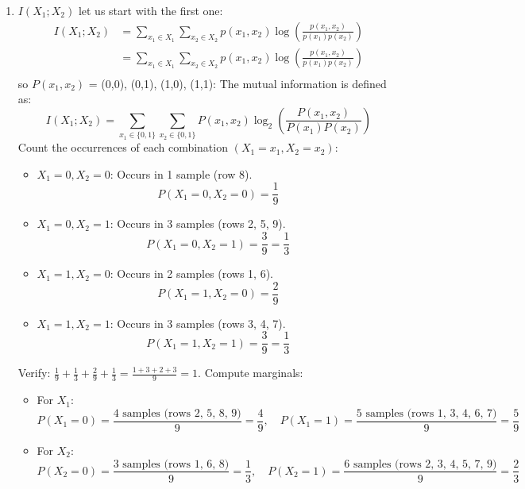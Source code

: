 \documentclass[a3paper,12pt]{extarticle} %
\begin{document}
\begin{enumerate}
    \item \( I(X_1; X_2) \)
let us start with the first one:
\begin{align*}
I(X_1; X_2) &= \sum_{x_1 \in X_1} \sum_{x_2 \in X_2} p(x_1,x_2) \log\left(\frac{p(x_1,x_2)}{p(x_1)p(x_2)}\right)\\
&= \sum_{x_1 \in X_1} \sum_{x_2 \in X_2} p(x_1,x_2) \log\left(\frac{p(x_1,x_2)}{p(x_1)p(x_2)}\right)\\
\end{align*}
so \(P(x_1, x_2)\) = (0,0), (0,1), (1,0), (1,1):
The mutual information is defined as:
\[
I(X_1; X_2) = \sum_{x_1 \in \{0,1\}} \sum_{x_2 \in \{0,1\}} P(x_1, x_2) \log_2 \left( \frac{P(x_1, x_2)}{P(x_1)P(x_2)} \right)
\]
Count the occurrences of each combination \((X_1 = x_1, X_2 = x_2)\):
\begin{itemize}
    \item \(X_1 = 0, X_2 = 0\): Occurs in 1 sample (row 8).
    \[
    P(X_1 = 0, X_2 = 0) = \frac{1}{9}
    \]
    \item \(X_1 = 0, X_2 = 1\): Occurs in 3 samples (rows 2, 5, 9).
    \[
    P(X_1 = 0, X_2 = 1) = \frac{3}{9} = \frac{1}{3}
    \]
    \item \(X_1 = 1, X_2 = 0\): Occurs in 2 samples (rows 1, 6).
    \[
    P(X_1 = 1, X_2 = 0) = \frac{2}{9}
    \]
    \item \(X_1 = 1, X_2 = 1\): Occurs in 3 samples (rows 3, 4, 7).
    \[
    P(X_1 = 1, X_2 = 1) = \frac{3}{9} = \frac{1}{3}
    \]
\end{itemize}
Verify: \(\frac{1}{9} + \frac{1}{3} + \frac{2}{9} + \frac{1}{3} = \frac{1 + 3 + 2 + 3}{9} = 1\).
Compute marginals:
\begin{itemize}
    \item For \(X_1\):
    \[
    P(X_1 = 0) = \frac{\text{4 samples (rows 2, 5, 8, 9)}}{9} = \frac{4}{9}, \quad P(X_1 = 1) = \frac{\text{5 samples (rows 1, 3, 4, 6, 7)}}{9} = \frac{5}{9}
    \]
    \item For \(X_2\):
    \[
    P(X_2 = 0) = \frac{\text{3 samples (rows 1, 6, 8)}}{9} = \frac{1}{3}, \quad P(X_2 = 1) = \frac{\text{6 samples (rows 2, 3, 4, 5, 7, 9)}}{9} = \frac{2}{3}
    \]
\end{itemize}


\end{enumerate}
\end{document}
